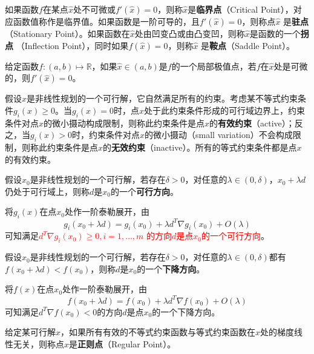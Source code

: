 \begin{definition}[驻点、临界点、拐点、鞍点]
如果函数$f$在某点$\hat x$处不可微或$f'(\hat x) = 0$，则称$\hat x$是\textbf{临界点}（Critical Point），对应函数值称作是临界值。如果函数是一阶可导的，且$f'(\hat x) = 0$，则称点$\hat x$ 是\textbf{驻点}（Stationary Point）。如果函数在$\hat x$处由凹变凸或由凸变凹，则称$\hat x$是函数的一个\textbf{拐点}
（Inflection Point），同时如果$f(\hat x)=0$，则称$\hat x$ 是\textbf{鞍点}（Saddle Point）。
\end{definition}

\begin{theorem}[费马定理]
给定函数$f:(a,b) \mapsto \mathbb R$，如果$\hat x\in(a,b)$是$f$的一个局部极值点，若$f$在$\hat x$处是可微的，则$f'(\hat x) = 0$。
\end{theorem}

\begin{definition}[有效约束和无效约束]
假设$x$是非线性规划的一个可行解，它自然满足所有的约束。考虑某不等式约束条件$g_i(x)\ge 0$。当$g_i(x)=0$时，点$x$处于此约束条件形成的可行域边界上，约束条件对点$x$的微小摄动构成限制，则称此约束条件是点$x$的\textbf{有效约束}（active）；反之，当$g_i(x)>0$时，约束条件对点$x$的微小摄动（small variation）不会构成限制，则称此约束条件是点$x$的\textbf{无效约束}（inactive）。所有的等式约束条件都是点$x$的有效约束。
\end{definition}

\begin{definition}[可行方向]
假设$x_0$是非线性规划的一个可行解，若存在$\delta>0$，对任意的$\lambda\in (0,\delta)$，$x_0+\lambda d$仍处于可行域上，则称$d$是$x_0$的一个\textbf{可行方向}。
\end{definition}

将$g_i(x)$在点$x_0$处作一阶泰勒展开，由
\[
    g_i(x_0+\lambda d) = g_i(x_0) + \lambda d^T \nabla g_i(x_0) + O(\lambda)
\]
可知满足\textcolor{red}{$d^T \nabla g_i(x_0) \ge 0,i=1,\ldots,m$ 的方向$d$是点$x_0$的一个可行方向}。

\begin{definition}[下降方向]
假设$x_0$是非线性规划的一个可行解，若存在$\delta>0$，对任意的$\lambda\in (0,\delta)$都有$f(x_0+\lambda d)<f(x_0)$，则称$d$是$x_0$的一个\textbf{下降方向}。
\end{definition}

将$f(x)$在点$x_0$处作一阶泰勒展开，由
\[
    f(x_0+\lambda d) = f(x_0) + \lambda d^T \nabla f(x_0) + O(\lambda)
\]
可知满足$d^T \nabla f(x_0) < 0$的方向$d$是点$x_0$的一个下降方向。

\begin{definition}[正则点]
给定某可行解$x$，如果所有有效的不等式约束函数与等式约束函数在$x$处的梯度线性无关，则称点$x$是\textbf{正则点}（Regular Point）。
\end{definition}

